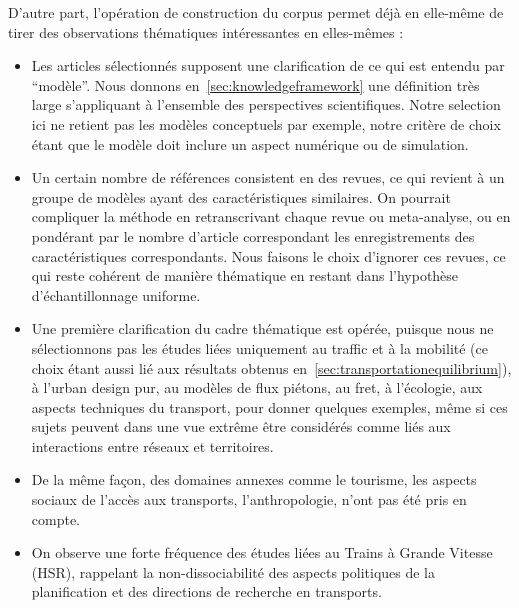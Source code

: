 D'autre part, l'opération de construction du corpus permet déjà en elle-même de tirer des observations thématiques intéressantes en elles-mêmes :

\begin{itemize}
\item Les articles sélectionnés supposent une clarification de ce qui est entendu par ``modèle''. Nous donnons en~\ref{sec:knowledgeframework} une définition très large s'appliquant à l'ensemble des perspectives scientifiques. Notre selection ici ne retient pas les modèles conceptuels par exemple, notre critère de choix étant que le modèle doit inclure un aspect numérique ou de simulation.
\item Un certain nombre de références consistent en des revues, ce qui revient à un groupe de modèles ayant des caractéristiques similaires. On pourrait compliquer la méthode en retranscrivant chaque revue ou meta-analyse, ou en pondérant par le nombre d'article correspondant les enregistrements des caractéristiques correspondants. Nous faisons le choix d'ignorer ces revues, ce qui reste cohérent de manière thématique en restant dans l'hypothèse d'échantillonnage uniforme.
\item Une première clarification du cadre thématique est opérée, puisque nous ne sélectionnons pas les études liées uniquement au traffic et à la mobilité (ce choix étant aussi lié aux résultats obtenus en~\ref{sec:transportationequilibrium}), à l'urban design pur, au modèles de flux piétons, au fret, à l'écologie, aux aspects techniques du transport, pour donner quelques exemples, même si ces sujets peuvent dans une vue extrême être considérés comme liés aux interactions entre réseaux et territoires.
\item De la même façon, des domaines annexes comme le tourisme, les aspects sociaux de l'accès aux transports, l'anthropologie, n'ont pas été pris en compte.
\item On observe une forte fréquence des études liées au Trains à Grande Vitesse (HSR), rappelant la non-dissociabilité des aspects politiques de la planification et des directions de recherche en transports.%
\end{itemize}


